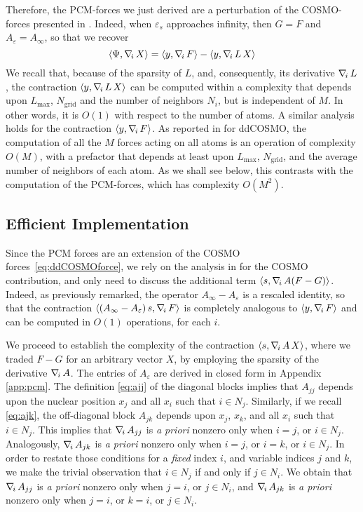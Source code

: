 Therefore, the PCM-forces we just derived are a perturbation of the COSMO-forces presented in \cite{Lipparini_JCTC_ddCOSMO}. Indeed, when $\varepsilon_s$ approaches infinity, then $G = F$ and $A_\varepsilon = {A_\infty} $, so that we recover
\begin{equation}
	\label{eq:ddCOSMOforce}
	\langle \Psi , \nabla_{\!i}\, X\rangle =  \langle y , \nabla_{\!i}\, F \rangle - \langle y , \nabla_{\!i}\, L \,  X \rangle
\end{equation}
We recall that, because of the sparsity of $L$, and, consequently, its derivative $\nabla_{\!i}\, L$, the contraction $\langle y ,\nabla_{\!i}\, L \, X\rangle$ can be computed within a complexity that depends upon $L_\text{max}$, $N_\text{grid}$ and the number of neighbors $N_i$, but is independent of $M$. In other words, it is $O(1)$ with respect to the number of atoms. A similar analysis holds for the contraction $\langle y , \nabla_{\!i}\, F \rangle$. As reported in \cite{Lipparini_JCTC_ddCOSMO} for ddCOSMO, the computation of all the $M$ forces acting on all atoms is an operation of complexity $O(M)$, with a prefactor that depends at least upon $L_\text{max}$, $N_\text{grid}$, and the average number of neighbors of each atom. As we shall see below, this contrasts with the computation of the PCM-forces, which has complexity $O(M^2)$.

\subsection{Efficient Implementation}

Since the PCM forces are an extension of the COSMO forces~\eqref{eq:ddCOSMOforce}, we rely on the analysis in \cite{Lipparini_JCTC_ddCOSMO} for the COSMO contribution, and only need to discuss the additional term $\langle s , \nabla_{\!i}\,  A ( F - G ) \rangle$. Indeed, as previously remarked, the operator ${A_\infty} -{A_\varepsilon}$ is a rescaled identity, so that the contraction $\langle ({A_\infty}-{A_\varepsilon})\, s, \nabla_{\!i}\, F \rangle$ is completely analogous to $\langle y , \nabla_{\!i}\, F \rangle$ and can be computed in $O(1)$ operations, for each $i$.
 
 
We proceed to establish the complexity of the contraction $\langle s , \nabla_{\!i}\,  A\, X \rangle$, where we traded $F-G$ for an arbitrary vector $X$, by employing the sparsity of the derivative $\nabla_{\!i}\, A$. The entries of $A_\varepsilon$ are derived in closed form in Appendix \ref{app:pcm}. The definition \eqref{eq:ajj} of the diagonal blocks implies that $A_{jj}$ depends upon the nuclear position $x_j$ and all $x_i$ such that $i \in N_j$. Similarly, if we recall \eqref{eq:ajk}, the off-diagonal block $A_{jk}$ depends upon $x_j$, $x_k$, and all $x_i$ such that $i \in N_j$. This implies that $\nabla_{\!i}\, A_{jj}$ is \emph{a priori} nonzero only when $i = j$, or $i \in N_j$. Analogously, $\nabla_{\!i}\, A_{jk}$ is \emph{a priori} nonzero only when $i = j$, or $i = k$, or $i \in N_j$. In order to restate those conditions for a \emph{fixed} index $i$, and variable indices $j$ and $k$, we make the trivial observation that $i \in N_j$ if and only if $j \in N_i$. We obtain that $\nabla_{\!i}\, A_{jj}$ is \emph{a priori} nonzero only when $j = i$, or $j \in N_i$, and $\nabla_{\!i}\, A_{jk}$ is \emph{a priori} nonzero only when $j= i$, or $k = i$, or $j \in N_i$.

